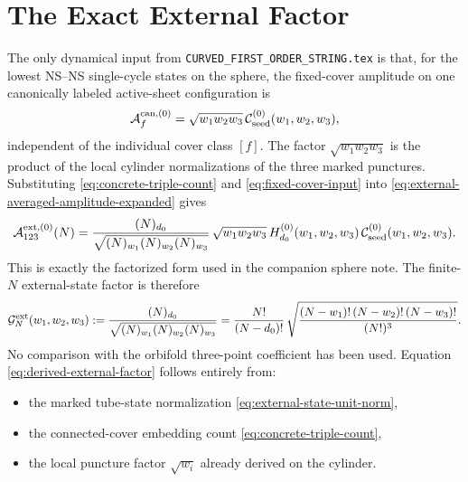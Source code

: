 \documentclass[11pt]{article}
\newcommand{\mc}[1]{\mathcal{#1}}
\begin{document}
\section{The Exact External Factor}
The only dynamical input from \texttt{CURVED\_FIRST\_ORDER\_STRING.tex} is that, for the lowest NS--NS single-cycle states on the sphere, the fixed-cover amplitude on one canonically labeled active-sheet configuration is
\begin{equation}\label{eq:fixed-cover-input}
\mc A_{f}^{\rm can,(0)}
=
\sqrt{w_1w_2w_3}\,
\mc C_{\rm seed}^{(0)}(w_1,w_2,w_3),
\end{equation}
independent of the individual cover class $[f]$. The factor $\sqrt{w_1w_2w_3}$ is the product of the local cylinder normalizations of the three marked punctures. Substituting \eqref{eq:concrete-triple-count} and \eqref{eq:fixed-cover-input} into \eqref{eq:external-averaged-amplitude-expanded} gives
\begin{equation}\label{eq:exact-external-amplitude}
\mc A_{123}^{\rm ext,(0)}(N)
=
\frac{(N)_{d_0}}{\sqrt{(N)_{w_1}(N)_{w_2}(N)_{w_3}}}
\,
\sqrt{w_1w_2w_3}\,
H_{d_0}^{(0)}(w_1,w_2,w_3)\,
\mc C_{\rm seed}^{(0)}(w_1,w_2,w_3).
\end{equation}
This is exactly the factorized form used in the companion sphere note. The finite-$N$ external-state factor is therefore
\begin{equation}\label{eq:derived-external-factor}
\mc G_N^{\rm ext}(w_1,w_2,w_3)
:=
\frac{(N)_{d_0}}{\sqrt{(N)_{w_1}(N)_{w_2}(N)_{w_3}}}
=
\frac{N!}{(N-d_0)!}\,
\sqrt{
\frac{(N-w_1)!\,(N-w_2)!\,(N-w_3)!}{(N!)^3}
}.
\end{equation}
No comparison with the orbifold three-point coefficient has been used. Equation \eqref{eq:derived-external-factor} follows entirely from:
\begin{itemize}
\item the marked tube-state normalization \eqref{eq:external-state-unit-norm},
\item the connected-cover embedding count \eqref{eq:concrete-triple-count},
\item the local puncture factor $\sqrt{w_i}$ already derived on the cylinder.
\end{itemize}
\end{document}

